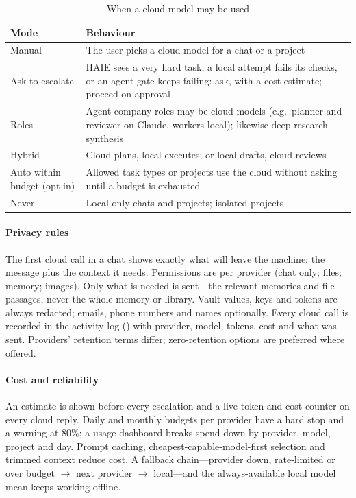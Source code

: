\begin{table}[t]
\caption{When a cloud model may be used}
\label{tab:cloudmodes}
\centering\footnotesize
\begin{tabularx}{\columnwidth}{@{}L{22mm}Y@{}}
\toprule
Mode & Behaviour \\
\midrule
Manual & The user picks a cloud model for a chat or a project \\
Ask to escalate & HAIE sees a very hard task, a local attempt fails its checks, or an agent gate keeps failing: ask, with a cost estimate; proceed on approval \\
Roles & Agent-company roles may be cloud models (e.g.\ planner and reviewer on Claude, workers local); likewise deep-research synthesis \\
Hybrid & Cloud plans, local executes; or local drafts, cloud reviews \\
Auto within budget (opt-in) & Allowed task types or projects use the cloud without asking until a budget is exhausted \\
Never & Local-only chats and projects; isolated projects \\
\bottomrule
\end{tabularx}
\end{table}

\paragraph{Privacy rules} The first cloud call in a chat shows exactly what will leave the machine: the message plus the context it needs. Permissions are per provider (chat only; files; memory; images). Only what is needed is sent---the relevant memories and file passages, never the whole memory or library. Vault values, keys and tokens are always redacted; emails, phone numbers and names optionally. Every cloud call is recorded in the activity log () with provider, model, tokens, cost and what was sent. Providers' retention terms differ; zero-retention options are preferred where offered.

\paragraph{Cost and reliability} An estimate is shown before every escalation and a live token and cost counter on every cloud reply. Daily and monthly budgets per provider have a hard stop and a warning at 80\%; a usage dashboard breaks spend down by provider, model, project and day. Prompt caching, cheapest-capable-model-first selection and trimmed context reduce cost. A fallback chain---provider down, rate-limited or over budget $\rightarrow$ next provider $\rightarrow$ local---and the always-available local model mean \hivi{} keeps working offline.

